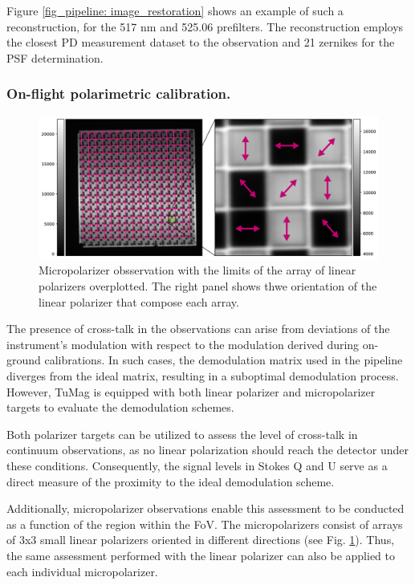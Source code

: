 Figure \ref{fig_pipeline:  image_restoration} shows an example of such a reconstruction, for the 517 nm and 525.06 prefilters. The reconstruction employs the closest PD measurement dataset to the observation and 21 zernikes for the PSF determination.   

\subsubsection{On-flight polarimetric calibration.}
\begin{figure}[t]
  \includegraphics[width=\textwidth]{figures/Pipeline/Micrpols_edit.pdf}
  \caption[Micropolarizer observations.]{
   Micropolarizer obsservation with the limits of the array of linear polarizers overplotted. The right panel shows thwe orientation of the linear polarizer that compose each array. }
    \label{fig_pipeline: micropols_calib}
\end{figure}
The presence of cross-talk in the observations can arise from deviations of the instrument's modulation with respect to the modulation derived during on-ground calibrations. In such cases, the demodulation matrix used in the pipeline diverges from the ideal matrix, resulting in a suboptimal demodulation process. However, TuMag is equipped with both linear polarizer and micropolarizer targets to evaluate the demodulation schemes.

Both polarizer targets can be utilized to assess the level of cross-talk in continuum observations, as no linear polarization should reach the detector under these conditions. Consequently, the signal levels in Stokes Q and U serve as a direct measure of the proximity to the ideal demodulation scheme.

Additionally, micropolarizer observations enable this assessment to be conducted as a function of the region within the FoV. The micropolarizers consist of arrays of 3x3 small linear polarizers oriented in different directions (see Fig. \ref{fig_pipeline: micropols_calib}). Thus, the same assessment performed with the linear polarizer can also be applied to each individual micropolarizer.


